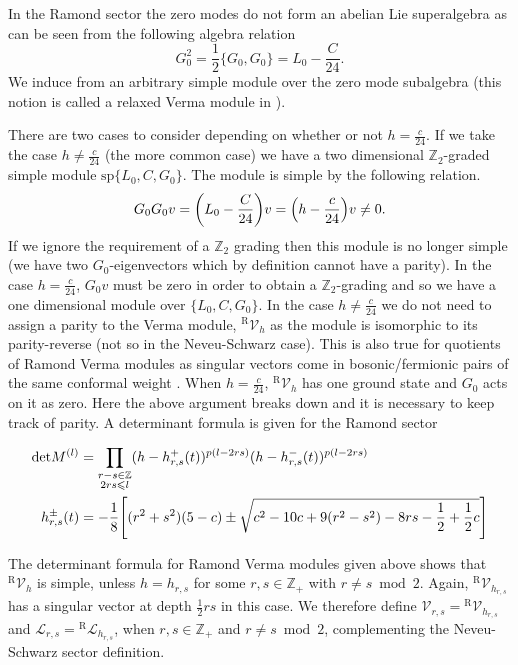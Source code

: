 \documentclass[a4paper,reqno,12pt]{report}
\theoremstyle{definition}
\newcommand{\Z}{\mathbb{Z}}
\numberwithin{equation}{section}
\let\originalleft\left     %
\let\originalright\right
\renewcommand{\left}{\mathopen{}\mathclose\bgroup\originalleft}
\renewcommand{\right}{\aftergroup\egroup\originalright}
\newcommand{\brac}[1]{\left( #1 \right)}
\newcommand{\ZZ}{\mathbb{Z}}
\newcommand{\acomm}[2]{\bigl\{ #1 , #2 \bigr\}}
\newcommand{\Ver}[1]{\mathcal{V}_{#1}}       %
\newcommand{\Irr}[1]{\mathcal{L}_{#1}}       %
\newcommand{\ns}{Neveu-Schwarz}
\newcommand{\ram}{Ramond}
\renewcommand{\le}{\leqslant}
\theoremstyle{plain}
\newcommand{\RVer}[1]{{}^{\text{R}}\Ver{#1}}       %
\newcommand{\RIrr}[1]{{}^{\text{R}}\Irr{#1}}       %
\begin{document}
In the Ramond sector the zero modes do not form an abelian Lie superalgebra as can be seen from the following algebra relation
\begin{equation} \label{eq:G_0^2}
G_0^2 = \frac{1}{2} \acomm{G_0}{G_0} = L_0 - \frac{C}{24}.
\end{equation}
We induce from an arbitrary simple module over the zero  mode subalgebra  (this notion is called a relaxed Verma module in \cite{RidRel15}).

There are two cases to consider depending on whether or not $h=\frac{c}{24}$. If we take the case $h\neq\frac{c}{24}$ (the more common case) we have a two dimensional $\ZZ_2$-graded simple module  $\text{sp}\{L_0, C, G_0\}$. The module is simple by the following relation.
\begin{equation}
G_0 G_0 v = \brac{L_0 - \frac{C}{24}} v = \brac{h - \frac{c}{24}} v \neq 0.
\end{equation}
If we  ignore the requirement of a $\ZZ_2$ grading then this module is no longer simple (we have two $G_0$-eigenvectors which by definition cannot have a parity). In the case $h=\frac{c}{24}$, $G_0v$ must be zero in order to obtain a $\ZZ_2$-grading and so we have a one dimensional module over $\{L_0, C, G_0\}$.
In the case $h\neq \frac{c}{24}$ we do not need to assign a parity to the Verma module,  $\RVer{h}$ as the module is isomorphic to its parity-reverse (not so in the \ns{} case). This is also true for quotients of Ramond Verma modules as singular vectors come in bosonic/fermionic pairs of the same conformal weight \cite[Rem~3.2]{IohRepI03}. When $h=\frac{c}{24}$, $\RVer{h}$ has one ground state and $G_0$ acts on it as zero. Here the above argument breaks down and it is necessary to keep track of parity. A determinant formula is given for the \ram{} sector


\begin{align*}
\text{det} M^{(l)} &= \prod_{\substack{r-s \in\Z \\ 2rs\le l}} (h - h_{r,s}^+ (t))^{p(l-2rs)}(h - h_{r,s}^- (t))^{p(l-2rs)}\\
h_{r,s}^{\pm}(t)  &= -\frac{1}{8}\left[(r^2+s^2)(5-c)\pm\sqrt{c^2-10c+9(r^2-s^2)-8rs-\frac{1}{2}+\frac{1}{2}c}\right]
\end{align*}

The determinant formula \cite{FriSup85,MeuHig86} for Ramond Verma modules given above shows that $\RVer{h}$ is simple, unless $h = h_{r,s}$ for some $r,s \in \ZZ_+$ with $r \neq s \bmod{2}$.  Again, $\RVer{h_{r,s}}$ has a singular vector at depth $\frac{1}{2} rs$ in this case.  We therefore define $\Ver{r,s} = \RVer{h_{r,s}}$ and $\Irr{r,s} = \RIrr{h_{r,s}}$, when $r,s \in \ZZ_+$ and $r \neq s \bmod{2}$, complementing the \ns{} sector definition.
\end{document}
